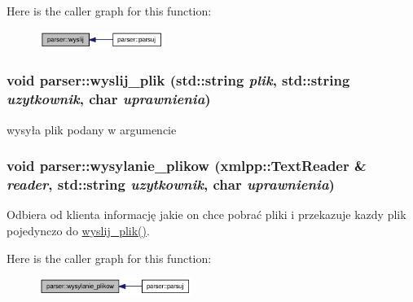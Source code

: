 Here is the caller graph for this function:\nopagebreak
\begin{figure}[H]
\begin{center}
\leavevmode
\includegraphics[width=115pt]{dd/dad/a00005_2f6aceaa94a28fc699e4f824f7622b51_icgraph}
\end{center}
\end{figure}
\hypertarget{a00005_e726284253cddec4b4b547a9d0254380}{
\subsubsection[{wyslij\_\-plik}]{\setlength{\rightskip}{0pt plus 5cm}void parser::wyslij\_\-plik (std::string {\em plik}, \/  std::string {\em uzytkownik}, \/  char {\em uprawnienia})}}
\label{dd/dad/a00005_e726284253cddec4b4b547a9d0254380}


wysyła plik podany w argumencie 

\hypertarget{a00005_0315a358465b40be344fddc7926c1316}{
\subsubsection[{wysylanie\_\-plikow}]{\setlength{\rightskip}{0pt plus 5cm}void parser::wysylanie\_\-plikow (xmlpp::TextReader \& {\em reader}, \/  std::string {\em uzytkownik}, \/  char {\em uprawnienia})}}
\label{dd/dad/a00005_0315a358465b40be344fddc7926c1316}


Odbiera od klienta informację jakie on chce pobrać pliki i przekazuje kazdy plik pojedynczo do \hyperlink{a00005_e726284253cddec4b4b547a9d0254380}{wyslij\_\-plik()}. 



Here is the caller graph for this function:\nopagebreak
\begin{figure}[H]
\begin{center}
\leavevmode
\includegraphics[width=140pt]{dd/dad/a00005_0315a358465b40be344fddc7926c1316_icgraph}
\end{center}
\end{figure}


